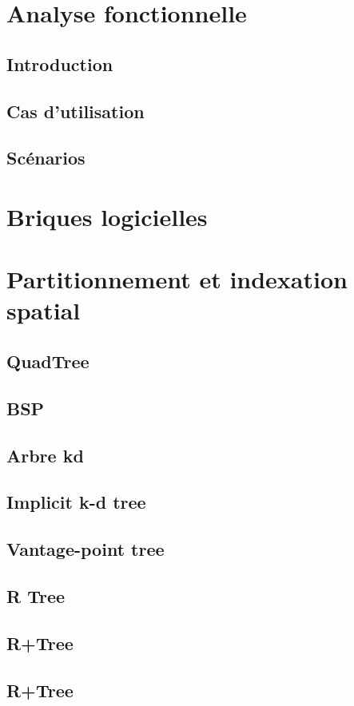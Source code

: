 \section{Analyse fonctionnelle}
\subsection{Introduction}
\subsection{Cas d'utilisation}
\subsection{Scénarios}
%
\section{Briques logicielles}

%
\section{Partitionnement et indexation spatial}
\subsection{QuadTree}
\subsection{BSP}
\subsection{Arbre kd}
\subsection{Implicit k-d tree}
\subsection{Vantage-point tree}
\subsection{R Tree}
\subsection{R+Tree}
\subsection{R+Tree}
